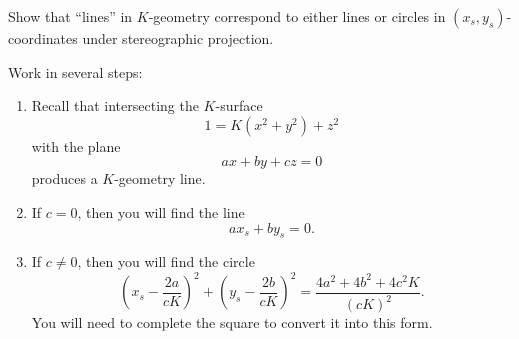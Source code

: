 \documentclass[newpage,hints,12pt,noauthor,nooutcomes,handout]{ximera}
\begin{document}
\begin{problem}
  Show that ``lines'' in $K$-geometry correspond to either lines or circles in
  $(x_{s},y_{s})$-coordinates under stereographic projection.

  \begin{hint}
    Work in several steps:
\begin{enumerate}
\item Recall that intersecting the $K$-surface
  \[
  1 = K\left(x^2+y^2\right) + z^2 
  \]
  with the plane
  \[
  ax+by+cz = 0
  \]
  produces a $K$-geometry line.
\item If $c=0$, then you will find the line
  \[
   ax_s + by_s = 0.
  \]
\item If $c\ne 0$, then you will find the circle
  \[
   \left(x_s - \frac{2a}{cK}\right)^2 + \left(y_s -
   \frac{2b}{cK}\right)^2 = \frac{4a^2 + 4b^2 + 4c^2K}{(cK)^2}.
   \]
   You will need to complete the square to convert it into this form.
\end{enumerate}
\end{hint}


\end{problem}
\end{document}
